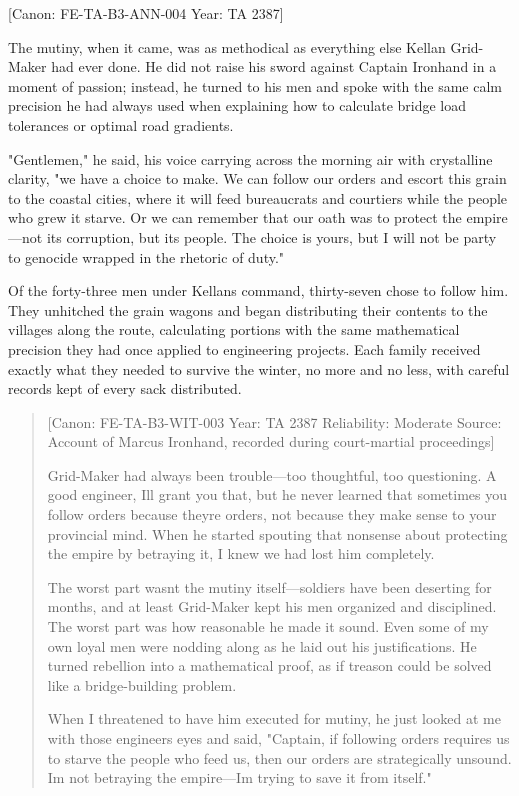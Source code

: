 {[}Canon: FE-TA-B3-ANN-004 \textbar{} Year: TA 2387{]}

The mutiny, when it came, was as methodical as everything else Kellan
Grid-Maker had ever done. He did not raise his sword against Captain
Ironhand in a moment of passion; instead, he turned to his men and spoke
with the same calm precision he had always used when explaining how to
calculate bridge load tolerances or optimal road gradients.

"Gentlemen," he said, his voice carrying across the morning air with
crystalline clarity, "we have a choice to make. We can follow our orders
and escort this grain to the coastal cities, where it will feed
bureaucrats and courtiers while the people who grew it starve. Or we can
remember that our oath was to protect the empire---not its corruption,
but its people. The choice is yours, but I will not be party to genocide
wrapped in the rhetoric of duty."

Of the forty-three men under Kellan\textquotesingle s command,
thirty-seven chose to follow him. They unhitched the grain wagons and
began distributing their contents to the villages along the route,
calculating portions with the same mathematical precision they had once
applied to engineering projects. Each family received exactly what they
needed to survive the winter, no more and no less, with careful records
kept of every sack distributed.

\begin{quote}
{[}Canon: FE-TA-B3-WIT-003 \textbar{} Year: TA 2387 \textbar{}
Reliability: Moderate \textbar{} Source: Account of Marcus Ironhand,
recorded during court-martial proceedings{]}

Grid-Maker had always been trouble---too thoughtful, too questioning. A
good engineer, I\textquotesingle ll grant you that, but he never learned
that sometimes you follow orders because they\textquotesingle re orders,
not because they make sense to your provincial mind. When he started
spouting that nonsense about protecting the empire by betraying it, I
knew we had lost him completely.

The worst part wasn\textquotesingle t the mutiny itself---soldiers have
been deserting for months, and at least Grid-Maker kept his men
organized and disciplined. The worst part was how reasonable he made it
sound. Even some of my own loyal men were nodding along as he laid out
his justifications. He turned rebellion into a mathematical proof, as if
treason could be solved like a bridge-building problem.

When I threatened to have him executed for mutiny, he just looked at me
with those engineer\textquotesingle s eyes and said, "Captain, if
following orders requires us to starve the people who feed us, then our
orders are strategically unsound. I\textquotesingle m not betraying the
empire---I\textquotesingle m trying to save it from itself."
\end{quote}

